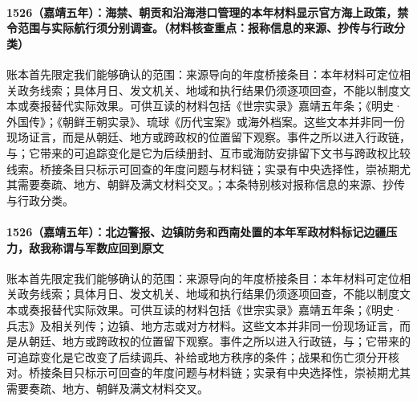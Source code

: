 \paragraph{1526（嘉靖五年）：海禁、朝贡和沿海港口管理的本年材料显示官方海上政策，禁令范围与实际航行须分别调查。（材料核查重点：报称信息的来源、抄传与行政分类）} 账本首先限定我们能够确认的范围：来源导向的年度桥接条目：本年材料可定位相关政务线索；具体月日、发文机关、地域和执行结果仍须逐项回查，不能以制度文本或奏报替代实际效果。可供互读的材料包括《世宗实录》嘉靖五年条；《明史·外国传》；《朝鲜王朝实录》、琉球《历代宝案》或海外档案。这些文本并非同一份现场证言，而是从朝廷、地方或跨政权的位置留下观察。事件之所以进入行政链，与；它带来的可追踪变化是它为后续册封、互市或海防安排留下文书与跨政权比较线索。桥接条目只标示可回查的年度问题与材料链；实录有中央选择性，崇祯期尤其需要奏疏、地方、朝鲜及满文材料交叉。；本条特别核对报称信息的来源、抄传与行政分类。

\paragraph{1526（嘉靖五年）：北边警报、边镇防务和西南处置的本年军政材料标记边疆压力，敌我称谓与军数应回到原文} 账本首先限定我们能够确认的范围：来源导向的年度桥接条目：本年材料可定位相关政务线索；具体月日、发文机关、地域和执行结果仍须逐项回查，不能以制度文本或奏报替代实际效果。可供互读的材料包括《世宗实录》嘉靖五年条；《明史·兵志》及相关列传；边镇、地方志或对方材料。这些文本并非同一份现场证言，而是从朝廷、地方或跨政权的位置留下观察。事件之所以进入行政链，与；它带来的可追踪变化是它改变了后续调兵、补给或地方秩序的条件；战果和伤亡须分开核对。桥接条目只标示可回查的年度问题与材料链；实录有中央选择性，崇祯期尤其需要奏疏、地方、朝鲜及满文材料交叉。

